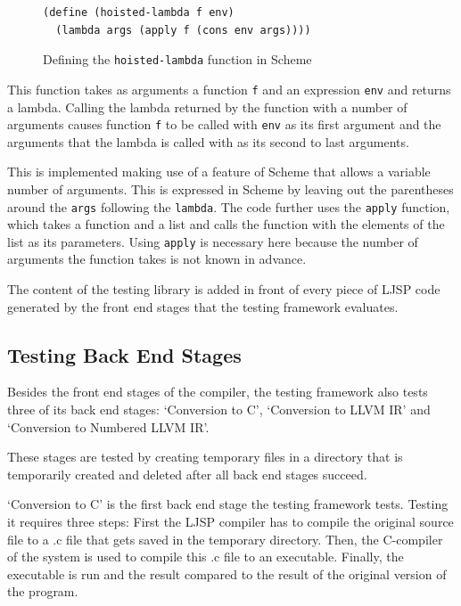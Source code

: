 \documentclass[11pt]{report}
\begin{document}
\begin{figure}[ht]
\begin{lstlisting}
(define (hoisted-lambda f env) 
  (lambda args (apply f (cons env args))))
\end{lstlisting}
\caption{Defining the \texttt{hoisted-lambda} function in Scheme}
\label{testing1}
\end{figure}

This function takes as arguments a function \texttt{f} and an expression \texttt{env} and returns a lambda. Calling the lambda returned by the function with a number of arguments causes function \texttt{f} to be called with \texttt{env} as its first argument and the arguments that the lambda is called with as its second to last arguments.

This is implemented making use of a feature of Scheme that allows a variable number of arguments. This is expressed in Scheme by leaving out the parentheses around the \texttt{args} following the \texttt{lambda}. The code further uses the \texttt{apply} function, which takes a function and a list and calls the function with the elements of the list as its parameters. Using \texttt{apply} is necessary here because the number of arguments the function takes is not known in advance.

The content of the testing library is added in front of every piece of LJSP code generated by the front end stages that the testing framework evaluates.

\subsection{Testing Back End Stages}

Besides the front end stages of the compiler, the testing framework also tests three of its back end stages: `Conversion to C', `Conversion to LLVM IR' and `Conversion to Numbered LLVM IR'.

These stages are tested by creating temporary files in a directory that is temporarily created and deleted after all back end stages succeed.

`Conversion to C' is the first back end stage the testing framework tests. Testing it requires three steps: First the LJSP compiler has to compile the original source file to a .c file that gets saved in the temporary directory. Then, the C-compiler of the system is used to compile this .c file to an executable. Finally, the executable is run and the result compared to the result of the original version of the program.
\end{document}
